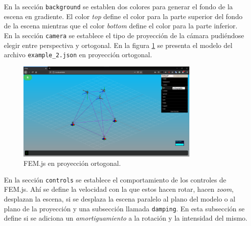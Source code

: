 

En la sección \verb|background| se establen dos colores para generar el fondo de la escena en gradiente. El color \emph{top} define el color para la parte superior del fondo de la escena mientras que el color \emph{bottom} define el color para la parte inferior.\\



En la sección \verb|camera| se establece el tipo de proyección de la cámara pudiéndose elegir entre perspectiva y ortogonal. En la figura \ref{fig:dat.gui-camera} se presenta el modelo del archivo \verb|example_2.json| en proyección ortogonal.\\

\begin{figure}[ht]
  \centering
  \includegraphics[width=0.8\textwidth]{introduction/dat-gui-camera.png}
  \caption{FEM.js en proyección ortogonal.}
  \label{fig:dat.gui-camera}
\end{figure}

En la sección \verb|controls| se establece el comportamiento de los controles de FEM.js. Ahí se define la velocidad con la que estos hacen rotar, hacen \emph{zoom}, desplazan la escena, si se desplaza la escena paralelo al plano del modelo o al plano de la proyección y una subsección llamada \verb|damping|. En esta subsección se define si se adiciona un \emph{amortiguamiento} a la rotación y la intensidad del mismo.\\

